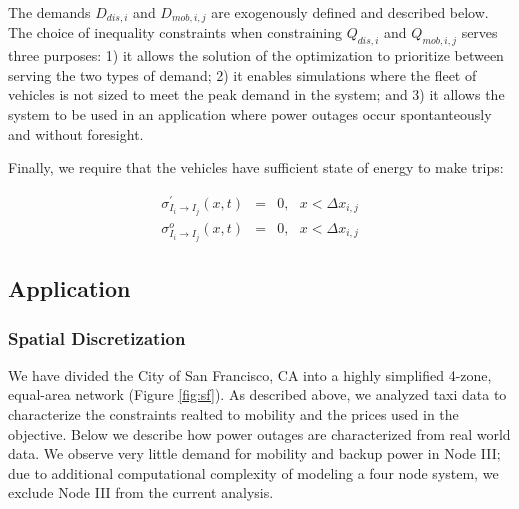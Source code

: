 \documentclass[journal]{IEEEtran}
\begin{document}
The demands $D_{dis,i}$ and $D_{mob,i,j}$ are exogenously defined and described below. The choice of inequality constraints when constraining $Q_{dis,i}$ and $Q_{mob,i,j}$ serves three purposes: 1) it allows the solution of the optimization to prioritize between serving the two types of demand; 2) it enables simulations where the fleet of vehicles is not sized to meet the peak demand in the system; and 3) it allows the system to be used in an application where power outages occur spontanteously and without foresight.

Finally, we require that the vehicles have sufficient state of energy to make trips:

\begin{eqnarray*}
    \sigma_{I_i \rightarrow I_j}^\prime(x,t) & = & 0, ~~~ x < \Delta x_{i,j} \\
    \sigma_{I_i \rightarrow I_j}^o(x,t) & = & 0, ~~~ x < \Delta x_{i,j}
\end{eqnarray*}

\subsection{Application}

\subsubsection{Spatial Discretization}
We have divided the City of San Francisco, CA into a highly simplified 4-zone, equal-area network (Figure \ref{fig:sf}). As described above, we analyzed taxi data to characterize the constraints realted to mobility and the prices used in the objective. Below we describe how power outages are characterized from real world data. We observe very little demand for mobility and backup power in Node III; due to additional computational complexity of modeling a four node system, we exclude Node III from the current analysis.
\end{document}
